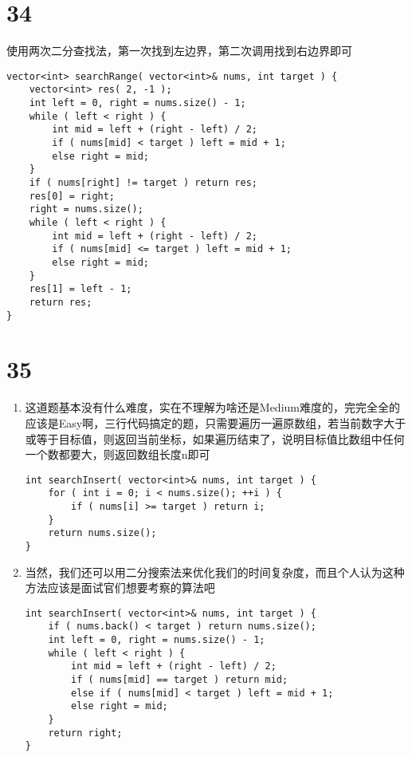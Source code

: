 \documentclass[12pt,a4paper]{article}
\begin{document}
\section{34}
\begin{CJK}{UTF8}{gbsn}
使用两次二分查找法，第一次找到左边界，第二次调用找到右边界即可
\end{CJK}
\begin{lstlisting}
vector<int> searchRange( vector<int>& nums, int target ) {
	vector<int> res( 2, -1 );
	int left = 0, right = nums.size() - 1;
	while ( left < right ) {
		int mid = left + (right - left) / 2;
		if ( nums[mid] < target ) left = mid + 1;
		else right = mid;
	}
	if ( nums[right] != target ) return res;
	res[0] = right;
	right = nums.size();
	while ( left < right ) {
		int mid = left + (right - left) / 2;
		if ( nums[mid] <= target ) left = mid + 1;
		else right = mid;
	}
	res[1] = left - 1;
	return res;
}
\end{lstlisting}

\section{35}
\begin{enumerate}
\item
\begin{CJK}{UTF8}{gbsn}
这道题基本没有什么难度，实在不理解为啥还是Medium难度的，完完全全的应该是Easy啊，三行代码搞定的题，只需要遍历一遍原数组，若当前数字大于或等于目标值，则返回当前坐标，如果遍历结束了，说明目标值比数组中任何一个数都要大，则返回数组长度n即可
\end{CJK}
\begin{lstlisting}
int searchInsert( vector<int>& nums, int target ) {
	for ( int i = 0; i < nums.size(); ++i ) {
		if ( nums[i] >= target ) return i;
	}
	return nums.size();
}
\end{lstlisting}
\item
\begin{CJK}{UTF8}{gbsn}
当然，我们还可以用二分搜索法来优化我们的时间复杂度，而且个人认为这种方法应该是面试官们想要考察的算法吧
\end{CJK}
\begin{lstlisting}
int searchInsert( vector<int>& nums, int target ) {
	if ( nums.back() < target ) return nums.size();
	int left = 0, right = nums.size() - 1;
	while ( left < right ) {
		int mid = left + (right - left) / 2;
		if ( nums[mid] == target ) return mid;
		else if ( nums[mid] < target ) left = mid + 1;
		else right = mid;
	}
	return right;
}
\end{lstlisting}
\end{enumerate}
\end{document}
